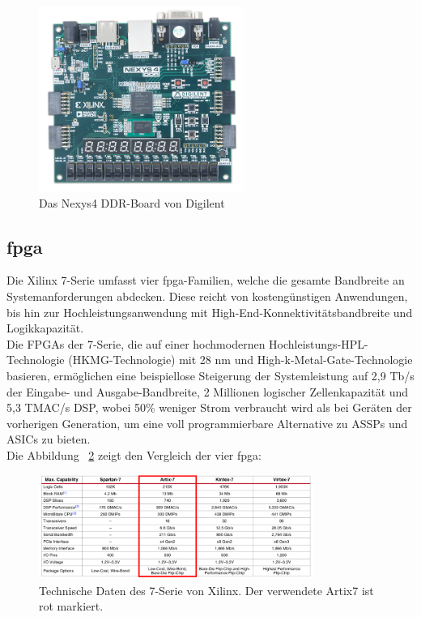 \begin{figure}[H]
\centering
\includegraphics[width=0.6\textwidth]{Hauptteil/nexys-4-ddr-2.png}
\caption{Das Nexys4 DDR-Board von Digilent ~\cite{digilent}}\label{fig:nexys4}
\end{figure}



\subsection{\ac{fpga}}\label{kap:fpga}
Die Xilinx 7-Serie umfasst vier \ac{fpga}-Familien, welche die gesamte Bandbreite an Systemanforderungen abdecken. Diese reicht von kostengünstigen Anwendungen, bis hin zur Hochleistungsanwendung mit High-End-Konnektivitätsbandbreite und Logikkapazität. \\
Die FPGAs der 7-Serie, die auf einer hochmodernen Hochleistungs-HPL-Technologie (HKMG-Technologie) mit 28 nm und High-k-Metal-Gate-Technologie basieren,
 ermöglichen eine beispiellose Steigerung der Systemleistung auf 2,9 Tb/s der Eingabe- und Ausgabe-Bandbreite, 2 Millionen logischer Zellenkapazität und 5,3 TMAC/s DSP,
 wobei 50\% weniger Strom verbraucht wird als bei Geräten der vorherigen Generation, um eine voll programmierbare Alternative zu ASSPs und ASICs zu bieten.\\
 Die Abbildung ~\ref{fig:7serie} zeigt den Vergleich der vier \ac{fpga}:~\cite{artix7}\\

 \begin{figure}[H]
 \centering
 \includegraphics[width=0.8\textwidth]{Hauptteil/7serie.png}
 \caption{Technische Daten des 7-Serie von Xilinx. Der verwendete Artix7 ist rot markiert.~\cite{artix7}~\cite{artix7}~\cite{artix7}}\label{fig:7serie}
 \end{figure}


